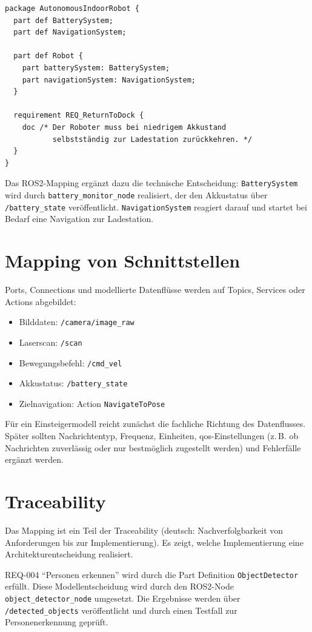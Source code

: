 \begin{lstlisting}
package AutonomousIndoorRobot {
  part def BatterySystem;
  part def NavigationSystem;

  part def Robot {
    part batterySystem: BatterySystem;
    part navigationSystem: NavigationSystem;
  }

  requirement REQ_ReturnToDock {
    doc /* Der Roboter muss bei niedrigem Akkustand
           selbstständig zur Ladestation zurückkehren. */
  }
}
\end{lstlisting}

Das ROS2-Mapping ergänzt dazu die technische Entscheidung: \texttt{BatterySystem} wird durch \texttt{battery\_monitor\_node} realisiert, der den Akkustatus über \texttt{/battery\_state} veröffentlicht. \texttt{NavigationSystem} reagiert darauf und startet bei Bedarf eine Navigation zur Ladestation.

\section{Mapping von Schnittstellen}
Ports, Connections und modellierte Datenflüsse werden auf Topics, Services oder Actions abgebildet:

\begin{itemize}
    \item Bilddaten: \texttt{/camera/image\_raw}
    \item Laserscan: \texttt{/scan}
    \item Bewegungsbefehl: \texttt{/cmd\_vel}
    \item Akkustatus: \texttt{/battery\_state}
    \item Zielnavigation: Action \texttt{NavigateToPose}
\end{itemize}

Für ein Einsteigermodell reicht zunächst die fachliche Richtung des Datenflusses. Später sollten Nachrichtentyp, Frequenz, Einheiten, \gls{qos}-Einstellungen (z.\,B. ob Nachrichten zuverlässig oder nur bestmöglich zugestellt werden) und Fehlerfälle ergänzt werden.

\section{Traceability}
Das Mapping ist ein Teil der Traceability (deutsch: Nachverfolgbarkeit von Anforderungen bis zur Implementierung). Es zeigt, welche Implementierung eine Architekturentscheidung realisiert.

\begin{praxisbox}
REQ-004 \enquote{Personen erkennen} wird durch die Part Definition \texttt{ObjectDetector} erfüllt. Diese Modellentscheidung wird durch den ROS2-Node \texttt{object\_detector\_node} umgesetzt. Die Ergebnisse werden über \texttt{/detected\_objects} veröffentlicht und durch einen Testfall zur Personenerkennung geprüft.
\end{praxisbox}

